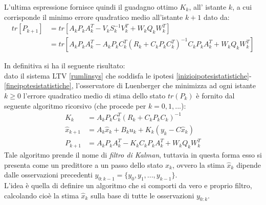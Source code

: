 \noindent L'ultima espressione fornisce quindi il guadagno ottimo $K_k$, all' istante $k$, a cui corrisponde il minimo errore quadratico medio all'istante $k+1$ dato da:
\begin{equation}
\begin{split}
tr[P_{k+1}]&=tr[A_kP_kA_k^T-V_kS^{-1}_kV^T_k+W_kQ_kW_k^T]\\ 
&=tr[A_kP_kA_k^T-A_kP_kC_k^T(R_k+C_kP_kC_k^T)^{-1}C_kP_kA_k^T+W_kQ_kW_k^T]
\end{split}
\end{equation}

\noindent In definitiva si ha il seguente risultato: \\
dato il sistema LTV \eqref{rumlinsys} che soddisfa le ipotesi \eqref{inizioipotesistatistiche}-\eqref{fineipotesistatistiche}, l'osservatore di Luenberger che minimizza ad ogni istante $k \geq 0$ l'errore quadratico medio di stima dello stato $tr(P_k)$ è fornito dal seguente algoritmo ricorsivo (che procede per $k = 0,1,...$):
\begin{align}
\label{luenb1}
K_k &= A_kP_kC_k^T(R_k+C_kP_kC_k)^{-1} \\
\label{luenb2}
\hat{x}_{k+1} &= A_k\hat{x}_k+B_ku_k+K_k(y_k-C\hat{x}_k)\\
\label{luenb3}
P_{k+1}&=A_kP_kA_k^T - K_kC_kP_kA_k^T+W_kQ_kW_k^T
\end{align}
Tale algoritmo prende il nome di \textit{filtro di Kalman}\cite{kalmanbucy}, tuttavia in questa forma esso si presenta come un predittore a un passo dello stato $x_k$, ovvero la stima $\hat{x}_k$ dipende dalle osservazioni precedenti $y_{0:k-1}=\{y_0,y_1,...,y_{k-1}\}$.\\
L'idea è quella di definire un algoritmo che si comporti da vero e proprio filtro, calcolando cioè la stima $\hat{x}_k$ sulla base di tutte le osservazioni $y_{0:k}$.
\newpage